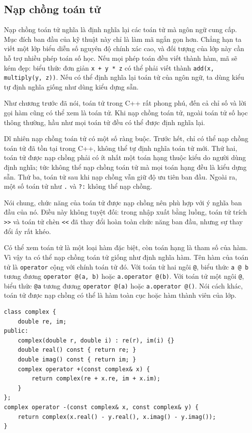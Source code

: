 \documentclass[11pt]{article}
\newcommand{\cpp}{C++}
\begin{document}
\subsection{Nạp chồng toán tử}

Nạp chồng toán tử nghĩa là định nghĩa lại các toán tử mà ngôn ngữ cung cấp.
Mục đích ban đầu của kỹ thuật này chỉ là làm mã ngắn gọn hơn. Chẳng hạn ta
viết một lớp biểu diễn số nguyên độ chính xác cao, và đối tượng của lớp này
cần hỗ trợ nhiều phép toán số học. Nếu mọi phép toán đều viết thành hàm, mã
sẽ kém đẹp: biểu thức đơn giản \verb|x + y * z| có thể phải viết thành
\verb|add(x, multiply(y, z))|. Nếu có thể định nghĩa lại toán tử của ngôn
ngữ, ta dùng kiểu tự định nghĩa giống như dùng kiểu dựng sẵn.

Như chương trước đã nói, toán tử trong \cpp{} rất phong phú, đến cả chỉ số và
lời gọi hàm cũng có thể xem là toán tử. Khi nạp chồng toán tử, ngoài toán tử
số học thông thường, hầu như mọi toán tử đều có thể được định nghĩa lại.

Dĩ nhiên nạp chồng toán tử có một số ràng buộc. Trước hết, chỉ có thể nạp
chồng toán tử đã tồn tại trong \cpp{}, không thể tự định nghĩa toán tử mới.
Thứ hai, toán tử được nạp chồng phải có ít nhất một toán hạng thuộc kiểu do
người dùng định nghĩa; tức không thể nạp chồng toán tử mà mọi toán hạng đều
là kiểu dựng sẵn. Thứ ba, toán tử sau khi nạp chồng vẫn giữ độ ưu tiên ban
đầu. Ngoài ra, một số toán tử như \verb|.| và \verb|?:| không thể nạp chồng.

Nói chung, chức năng của toán tử được nạp chồng nên phù hợp với ý nghĩa ban
đầu của nó. Điều này không tuyệt đối: trong nhập xuất bằng luồng, toán tử
trích \verb|>>| và toán tử chèn \verb|<<| đã thay đổi hoàn toàn chức năng ban
đầu, nhưng sự thay đổi ấy rất khéo.

Có thể xem toán tử là một loại hàm đặc biệt, còn toán hạng là tham số của hàm.
Vì vậy ta có thể nạp chồng toán tử giống như định nghĩa hàm. Tên hàm của toán
tử là \verb|operator| cộng với chính toán tử đó. Với toán tử hai ngôi
\verb|@|, biểu thức \verb|a @ b| tương đương \verb|operator @(a, b)| hoặc
\verb|a.operator @(b)|. Với toán tử một ngôi \verb|@|, biểu thức \verb|@a|
tương đương \verb|operator @(a)| hoặc \verb|a.operator @()|. Nói cách khác,
toán tử được nạp chồng có thể là hàm toàn cục hoặc hàm thành viên của lớp.

\begin{verbatim}
class complex {
    double re, im;
public:
    complex(double r, double i) : re(r), im(i) {}
    double real() const { return re; }
    double imag() const { return im; }
    complex operator +(const complex& x) {
        return complex(re + x.re, im + x.im);
    }
};
complex operator -(const complex& x, const complex& y) {
    return complex(x.real() - y.real(), x.imag() - y.imag());
}
\end{verbatim}
\end{document}
